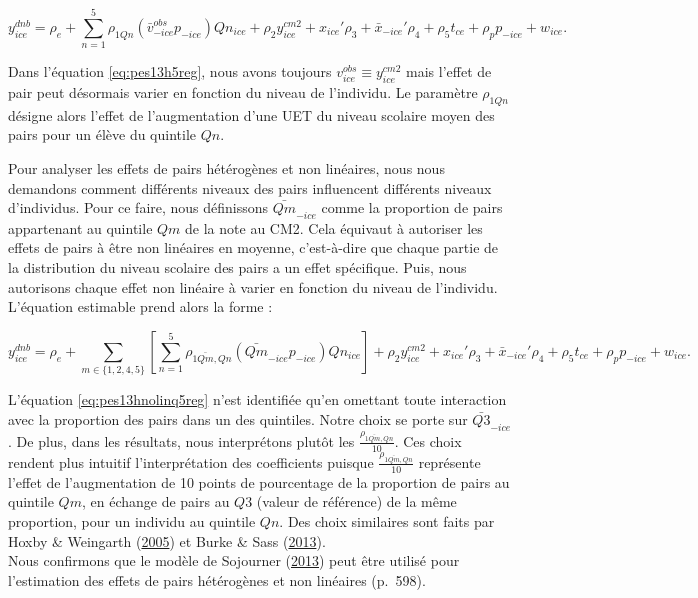 \documentclass[
]{book}
\begin{document}
\begin{equation}
\label{eq:pes13h5reg}
y^{dnb}_{ice} = \rho_e + \displaystyle\sum^5_{n = 1} \rho_{1Qn} (\bar{v}^{obs}_{-ice} p_{-ice})Qn_{ice} + \rho_2 y_{ice}^{cm2} + x_{ice}' \rho_3 + \bar{x}_{-ice}' \rho_4 + \rho_5 t_{ce} + \rho_p p_{-ice} + w_{ice}. 
\end{equation}

Dans l'équation \eqref{eq:pes13h5reg}, nous avons toujours \(v^{obs}_{ice} \equiv y^{cm2}_{ice}\) mais l'effet de pair peut désormais varier en fonction du niveau de l'individu. Le paramètre \(\rho_{1Qn}\) désigne alors l'effet de l'augmentation d'une UET du niveau scolaire moyen des pairs pour un élève du quintile \(Qn\).

\quad Pour analyser les effets de pairs hétérogènes et non linéaires, nous nous demandons comment différents niveaux des pairs influencent différents niveaux d'individus. Pour ce faire, nous définissons \(\bar{Qm}_{-ice}\) comme la proportion de pairs appartenant au quintile \(Qm\) de la note au CM2. Cela équivaut à autoriser les effets de pairs à être non linéaires en moyenne, c'est-à-dire que chaque partie de la distribution du niveau scolaire des pairs a un effet spécifique. Puis, nous autorisons chaque effet non linéaire à varier en fonction du niveau de l'individu. L'équation estimable prend alors la forme :

\begin{equation}
\label{eq:pes13hnolinq5reg}
y^{dnb}_{ice} = \rho_e + \displaystyle\sum_{m \in \{1, 2, 4, 5\}} 
[\displaystyle\sum_{n = 1}^5 \rho_{1\bar{Qm}, Qn} (\bar{Qm}_{-ice} p_{-ice}) Qn_{ice}] + \rho_2 y_{ice}^{cm2} + x_{ice}' \rho_3 + \bar{x}_{-ice}' \rho_4 + \rho_5 t_{ce} + \rho_p p_{-ice} + w_{ice}. 
\end{equation}

L'équation \eqref{eq:pes13hnolinq5reg} n'est identifiée qu'en omettant toute interaction avec la proportion des pairs dans un des quintiles. Notre choix se porte sur \(\bar{Q3}_{-ice}\). De plus, dans les résultats, nous interprétons plutôt les \(\frac{\rho_{1\bar{Qm},Qn}}{10}\). Ces choix rendent plus intuitif l'interprétation des coefficients puisque \(\frac{\rho_{1\bar{Qm}, Qn}}{10}\) représente l'effet de l'augmentation de 10 points de pourcentage de la proportion de pairs au quintile \(Qm\), en échange de pairs au \(Q3\) (valeur de référence) de la même proportion, pour un individu au quintile \(Qn\). Des choix similaires sont faits par Hoxby \& Weingarth (\protect\hyperlink{ref-HOX:WEI:05}{2005}) et Burke \& Sass (\protect\hyperlink{ref-BUR:SAS:13}{2013}).\\
Nous confirmons que le modèle de Sojourner (\protect\hyperlink{ref-SOJ:13}{2013}) peut être utilisé pour l'estimation des effets de pairs hétérogènes et non linéaires (p.~598).
\end{document}
